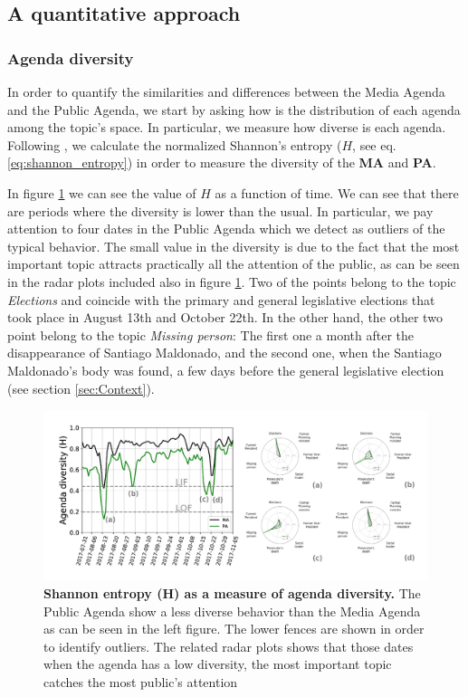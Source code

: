 \subsection{A quantitative approach}

\subsubsection{Agenda diversity}


\par In order to quantify the similarities and differences between the Media Agenda and the Public Agenda, we start by asking how is the distribution of each agenda among the topic's space. In particular, we measure how diverse is each agenda. Following \cite{boydstun2014importance}, we calculate the normalized Shannon's entropy ($H$, see eq.\ref{eq:shannon_entropy}) in order to measure the diversity of the \textbf{MA} and \textbf{PA}.
\par In figure \ref{fig:shannon_entropy_agendas} we can see the value of $H$ as a function of time. We can see that there are periods where the diversity is lower than the usual. In particular, we pay attention to four dates in the Public Agenda which we detect as outliers of the typical behavior. The small value in the diversity is due to the fact that the most important topic attracts practically all the attention of the public, as can be seen in the radar plots included also in figure \ref{fig:shannon_entropy_agendas}. 
Two of the points belong to the topic \emph{Elections} and coincide with the primary and general legislative elections that took place in August 13th and October 22th. In the other hand, the other two point belong to the topic \emph{Missing person}: The first one a month after the disappearance of Santiago Maldonado, and the second one, when the Santiago Maldonado's body was found, a few days before the general legislative election (see section \ref{sec:Context}).

\begin{figure}[h]
\centering
\includegraphics[width = \textwidth]{images/Fig3.pdf}
\caption{\textbf{Shannon entropy (H) as a measure of agenda diversity.} The Public Agenda show a less diverse behavior than the Media Agenda as can be seen in the left figure. The lower fences are shown in order to identify outliers. The related radar plots shows that those dates when the agenda has a low diversity, the most important topic catches the most public’s attention}
\label{fig:shannon_entropy_agendas}
\end{figure}


